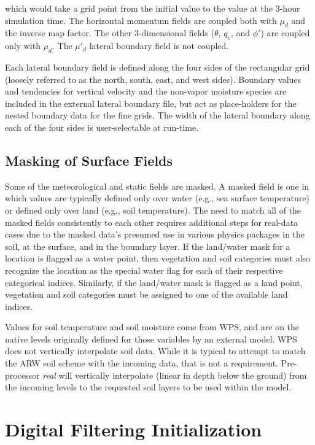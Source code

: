 \noindent which would take a grid point from the initial value to the value at the 3-hour simulation time. 
The horizontal momentum fields are coupled both with  $\mu_d$ and the inverse map factor.  The 
other 3-dimensional fields ($\theta$, $q_v$, and $\phi'$) are coupled only with $\mu_d$.
The $\mu'_d$ lateral boundary field is not coupled.

Each lateral boundary field
is defined along the four sides of the 
rectangular grid (loosely referred to as the north, south, east, and west sides).  
Boundary values and tendencies for vertical velocity and the non-vapor moisture species are included
in the external lateral boundary file, but act as
place-holders for the nested boundary data for the fine grids.
The width of the lateral
boundary along each of the four sides is user-selectable at run-time.

\subsection{Masking of Surface Fields}

Some of the meteorological and static fields are masked.  A masked field is one in which
values are typically defined only over water (e.g., sea surface temperature) or defined
only over land (e.g., soil temperature).
The need to match all of the masked fields consistently to each other requires additional steps
for real-data cases due to the masked data's presumed use in various physics packages in the soil, 
at the surface, and in the boundary layer.
If the land/water
mask for a location is flagged as a water point, then vegetation and soil categories must also
recognize the location as the special water flag for each of their respective categorical indices.  
Similarly, if the land/water mask is flagged as a land point, vegetation and soil
categories must be assigned to one of the available land indices.

Values for soil temperature and soil moisture come from WPS, and are on the 
native levels originally defined for those variables
by an external model.  WPS does not vertically interpolate
soil data.  While it is typical to attempt to match the ARW soil scheme with
the incoming data, that is not a requirement.  Pre-processor {\it real} will vertically interpolate 
(linear in depth below the ground) from the incoming levels to the requested soil layers to be
used within the model.

\section{Digital Filtering Initialization}

